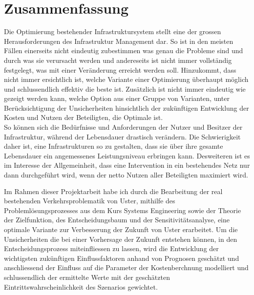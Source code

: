 %
%
%
%

\chapter*{Zusammenfassung}
\label{chap:Zusammen}

Die Optimierung bestehender Infrastruktursystem stellt eine der grossen Herausforderungen des Infrastruktur Management dar. So ist in den meisten Fällen einerseits nicht eindeutig zubestimmen was genau die Probleme sind und durch was sie verursacht werden und andereseits ist nicht immer vollständig festgelegt, was mit einer Veränderung erreicht werden soll. Hinzukommt, dass nicht immer ersichtlich ist, welche Variante einer Optimierung überhaupt möglich und schlussendlich effektiv die beste ist. Zusätzlich ist nicht immer eindeutig wie gezeigt werden kann, welche Option aus einer Gruppe von Varianten, unter Berücksichtigung der Unsicherheiten hinsichtlich der zukünftigen Entwicklung der Kosten und Nutzen der Beteiligten, die Optimale ist. \\
So können sich die Bedürfnisse und Anforderungen der Nutzer und Besitzer der Infrastruktur, während der Lebensdauer drastisch verändern. Die Schwierigkeit daher ist, eine  Infrastrukturen so zu gestalten, dass sie über ihre gesamte Lebensdauer ein angemessenes Leistungsniveau erbringen kann. Desweiteren ist es im Interesse der Allgemeinheit, dass eine Intervention in ein bestehendes Netz nur dann durchgeführt wird, wenn der netto Nutzen aller Beteiligten maximiert wird.

Im Rahmen dieser Projektarbeit habe ich durch die Bearbeitung der real bestehenden Verkehrsproblematik von Uster, mithilfe des Problemlösungsprozesses aus dem Kurs Systems Engineering sowie der Theorie der Zielfunktion, des Entscheidungsbaum und der Sensitivitätsanalyse, eine optimale Variante zur Verbesserung der Zukunft von Uster erarbeitet.
Um die Unsicherheiten die bei einer Vorhersage der Zukunft entstehen können, in den Entscheidungsprozess miteinfliessen zu lassen, wird die Entwicklung der wichtigsten zukünftigen Einflussfaktoren anhand von Prognosen geschätzt und anschliessend der Einfluss auf die Parameter der Kostenberchnung modelliert und schlussendlich der ermittelte Werte mit der geschätzten Eintrittswahrscheinlichkeit des Szenarios gewichtet.

